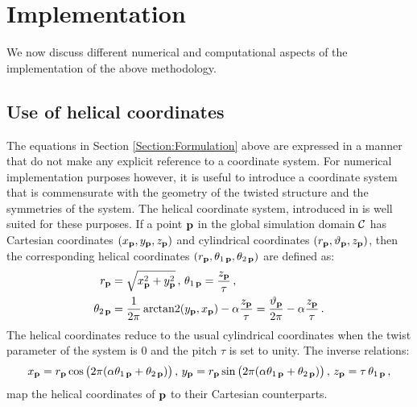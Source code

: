 \documentclass[preprint,12pt, 3p, sort&compress]{elsarticle}
\begin{document}
\section{Implementation}
\label{sec:implementation}
We now discuss different numerical and computational aspects of the implementation of the above methodology. 
\subsection{Use of helical coordinates}
\label{subsec:helical_coordinates}
The equations in Section \ref{Section:Formulation} above are expressed in a manner that do not make any explicit reference to a coordinate system. For numerical implementation purposes however, it is useful to introduce a coordinate system that is commensurate with the geometry of the twisted structure and the symmetries of the system. The helical coordinate system, introduced in \citep{My_PhD_Thesis, banerjee2021ab} is well suited for these purposes. If a point ${\bf p}$ in the global simulation domain ${\cal C}$ has Cartesian coordinates $(x_{{\bf p}},y_{{\bf p}},z_{{\bf p}})$ and cylindrical coordinates $(r_{{\bf p}}, \vartheta_{{\bf p}}, z_{{\bf p}})$, then the corresponding helical coordinates  $(r_{{\bf p}},\theta_{1\,{{\bf p}}},\theta_{2\,{{\bf p}}})$ are defined as:
\begin{align}
\nonumber
r_{{\bf p}} &= \sqrt{x_{{\bf p}}^2 + y_{{\bf p}}^2}\,,\,\theta_{1\,{{\bf p}}} =\frac{z_{{\bf p}}}{\tau}\,,\\
\theta_{2\,{{\bf p}}} &= \frac{1}{2\pi}\operatorname{arctan2}(y_{{\bf p}}, x_{{\bf p}})-\alpha \frac{z_{{\bf p}}}{\tau} = \frac{\vartheta_{{\bf p}}}{2\pi} - \alpha \frac{z_{{\bf p}}}{\tau}\,.
\label{eq:helical_coordinates}
\end{align}
The helical coordinates reduce to the usual cylindrical coordinates when the twist parameter of the system is $0$ and the pitch $\tau$ is set to unity. The inverse relations:
\begin{align}
x_{{\bf p}} = r_{{\bf p}}\cos\big(2\pi(\alpha\theta_{1\,{{\bf p}}}+\theta_{2\,{{\bf p}}})\big)\,,\, y_{{\bf p}} = r_{{\bf p}}\sin\big(2\pi(\alpha\theta_{1\,{{\bf p}}}+\theta_{2\,{{\bf p}}})\big)\,,\,z_{{\bf p}} = \tau\,\theta_{1\,{{\bf p}}}\,,
\label{eq:inverse_helical_coordinates}
\end{align} 
map the helical coordinates of ${\bf p}$ to their Cartesian counterparts. 
\end{document}

